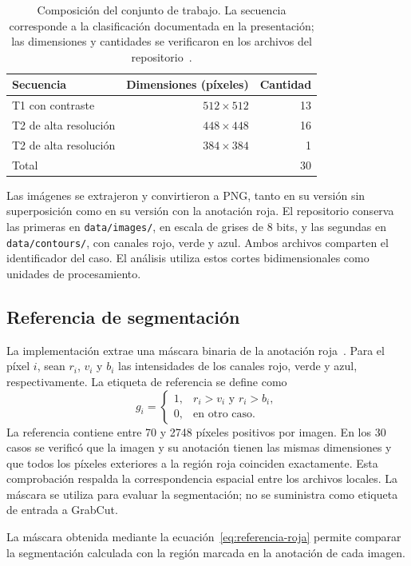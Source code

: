 \begin{table}[htbp]
\centering
\caption{Composición del conjunto de trabajo. La secuencia corresponde a la
clasificación documentada en la presentación; las dimensiones y cantidades
se verificaron en los archivos del repositorio~\cite{cuaderno}.}
\label{tab:composicion-datos}
\begin{tabular}{lrr}
\toprule
Secuencia & Dimensiones (píxeles) & Cantidad \\
\midrule
T1 con contraste & $512\times512$ & 13 \\
T2 de alta resolución & $448\times448$ & 16 \\
T2 de alta resolución & $384\times384$ & 1 \\
\midrule
Total & & 30 \\
\bottomrule
\end{tabular}
\end{table}

Las imágenes se extrajeron y convirtieron a PNG, tanto en su versión sin
superposición como en su versión con la anotación roja. El repositorio conserva las primeras en
\texttt{data/images/}, en escala de grises de 8 bits, y las segundas en
\texttt{data/contours/}, con canales rojo, verde y azul. Ambos archivos
comparten el identificador del caso. El análisis utiliza estos cortes
bidimensionales como unidades de procesamiento.

\subsection{Referencia de segmentación}

La implementación extrae una máscara binaria de la anotación
roja~\cite{cuaderno}. Para el píxel
$i$, sean $r_i$, $v_i$ y $b_i$ las intensidades de los canales rojo, verde y
azul, respectivamente. La etiqueta de referencia se define como
\begin{equation}
 g_i =
 \begin{cases}
  1, & r_i > v_i \text{ y } r_i > b_i,\\
  0, & \text{en otro caso}.
 \end{cases}
 \label{eq:referencia-roja}
\end{equation}
La referencia contiene entre 70 y 2748 píxeles positivos por imagen. En los
30 casos se verificó que la imagen y su anotación tienen las mismas
dimensiones y que todos los píxeles exteriores a la región roja coinciden
exactamente. Esta comprobación respalda la correspondencia espacial entre
los archivos locales. La máscara se utiliza para evaluar la segmentación;
no se suministra como etiqueta de entrada a GrabCut.

La máscara obtenida mediante la ecuación~\eqref{eq:referencia-roja}
permite comparar la segmentación calculada con la región marcada en la
anotación de cada imagen.
